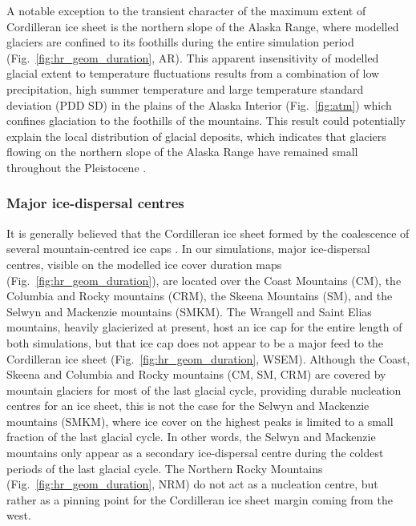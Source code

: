 \documentclass[tc, manuscript]{copernicus}
\begin{document}
A notable exception to the transient character of the maximum extent of
Cordilleran ice sheet
is the northern slope of the Alaska Range, where modelled glaciers are confined
to its foothills during the entire simulation period (Fig.~\ref{fig:hr_geom_duration},
AR). This apparent insensitivity of modelled glacial extent to temperature
fluctuations results from a combination of low precipitation, high summer
temperature and large temperature standard deviation (PDD SD) in the plains of the
Alaska Interior (Fig.~\ref{fig:atm}) which confines glaciation to the
foothills of the mountains. This result could potentially explain
the local distribution of glacial deposits, which indicates that glaciers
flowing on the northern slope of the Alaska Range
have remained small throughout the Pleistocene \citep{Kaufman.Manley.2004}.

\subsubsection{Major ice-dispersal centres}

It is generally believed that the Cordilleran ice sheet formed by the
coalescence of several mountain-centred ice caps \citep{Davis.Mathews.1944}.
In our simulations, major ice-dispersal centres, visible on the modelled ice
cover duration maps (Fig.~\ref{fig:hr_geom_duration}), are located over the Coast
Mountains (CM), the Columbia and Rocky mountains (CRM), the Skeena Mountains
(SM), and the Selwyn and Mackenzie mountains (SMKM). The Wrangell and
Saint Elias mountains, heavily glacierized at present, host an ice cap for the
entire length of both simulations, but that ice cap does not appear to be a
major feed to the Cordilleran ice sheet (Fig.~\ref{fig:hr_geom_duration}, WSEM).
Although the Coast, Skeena and Columbia and Rocky mountains (CM, SM, CRM)
are covered by mountain
glaciers for most of the last glacial cycle, providing durable nucleation
centres for an ice sheet, this is not the case for the Selwyn and
Mackenzie mountains (SMKM), where ice cover on the highest peaks is limited to a
small fraction of the last glacial cycle. In other words, the Selwyn and Mackenzie
mountains only appear as a secondary ice-dispersal centre
during the coldest periods of the last glacial cycle. The Northern Rocky
Mountains (Fig.~\ref{fig:hr_geom_duration}, NRM) do not act as a nucleation centre,
but rather as a pinning point for the Cordilleran ice sheet margin coming from
the west.
\end{document}
